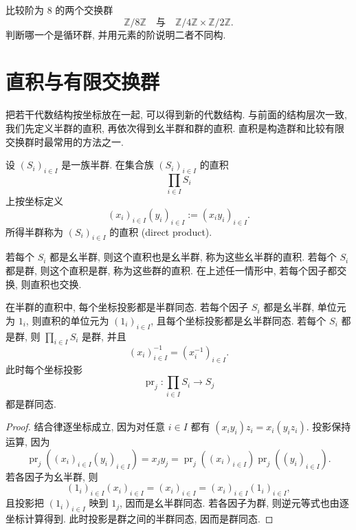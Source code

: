\documentclass[usesamecnt, thmcnt=section, lang=cn, newtx, 10pt, scheme=chinese]{elegantbook}
\begin{document}
\begin{exercise}\label{ex:alg-cyclic-classification-condition}
比较阶为 $8$ 的两个交换群
\[
 \mathbb Z/8\mathbb Z
 \quad\text{与}\quad
 \mathbb Z/4\mathbb Z\times\mathbb Z/2\mathbb Z.
\]
判断哪一个是循环群, 并用元素的阶说明二者不同构.
\end{exercise}

\section{直积与有限交换群}

把若干代数结构按坐标放在一起, 可以得到新的代数结构. 与前面的结构层次一致, 我们先定义半群的直积, 再依次得到幺半群和群的直积. 直积是构造群和比较有限交换群时最常用的方法之一.

\begin{definition}[半群、幺半群与群的直积]\label{def:alg-direct-product-group}
设 $(S_i)_{i\in I}$ 是一族半群. 在集合族 $(S_i)_{i\in I}$ 的直积
\[
 \prod_{i\in I}S_i
\]
上按坐标定义
\[
 (x_i)_{i\in I}(y_i)_{i\in I}:=(x_iy_i)_{i\in I}.
\]
所得半群称为 $(S_i)_{i\in I}$ 的{\color{blue}直积 (direct product)}.

若每个 $S_i$ 都是幺半群, 则这个直积也是幺半群, 称为这些幺半群的直积. 若每个 $S_i$ 都是群, 则这个直积是群, 称为这些群的直积. 在上述任一情形中, 若每个因子都交换, 则直积也交换.
\end{definition}

\begin{proposition}\label{prop:alg-product-group}
在半群的直积中, 每个坐标投影都是半群同态. 若每个因子 $S_i$ 都是幺半群, 单位元为 $1_i$, 则直积的单位元为 $(1_i)_{i\in I}$, 且每个坐标投影都是幺半群同态. 若每个 $S_i$ 都是群, 则 $\prod_{i\in I}S_i$ 是群, 并且
\[
 (x_i)_{i\in I}^{-1}=(x_i^{-1})_{i\in I}.
\]
此时每个坐标投影
\[
 \operatorname{pr}_j:\prod_{i\in I}S_i\to S_j
\]
都是群同态.
\end{proposition}

\begin{proof}
结合律逐坐标成立, 因为对任意 $i\in I$ 都有 $(x_iy_i)z_i=x_i(y_iz_i)$. 投影保持运算, 因为
\[
 \operatorname{pr}_j((x_i)_{i\in I}(y_i)_{i\in I})=x_jy_j
 =\operatorname{pr}_j((x_i)_{i\in I})\operatorname{pr}_j((y_i)_{i\in I}).
\]
若各因子为幺半群, 则
\[
 (1_i)_{i\in I}(x_i)_{i\in I}=(x_i)_{i\in I}=(x_i)_{i\in I}(1_i)_{i\in I},
\]
且投影把 $(1_i)_{i\in I}$ 映到 $1_j$, 因而是幺半群同态. 若各因子为群, 则逆元等式也由逐坐标计算得到. 此时投影是群之间的半群同态, 因而是群同态.
\end{proof}
\end{document}
